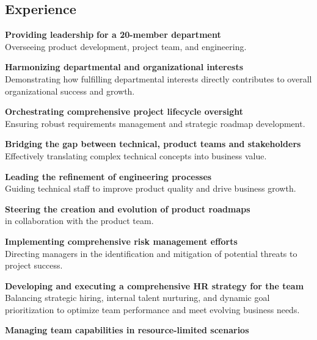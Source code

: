 \documentclass[]{external}
\begin{document}
\begin{paracol}{2}
    \section{Experience}
    \vspace{\topsep}
    \begin{tightemize}
        \item \textbf{Providing leadership} \textbf{for a 20-member department}\\
        Overseeing product development, project team, and engineering.
        \item \textbf{Harmonizing departmental and organizational interests} \\
        Demonstrating how fulfilling departmental interests directly contributes to overall organizational success and growth.
        \item \textbf{Orchestrating comprehensive project lifecycle oversight} \\
        Ensuring robust requirements management and strategic roadmap development.
        \item \textbf{Bridging the gap between technical, product teams and stakeholders} \\ Effectively translating complex technical concepts into business value.
        \item \textbf{Leading the refinement of engineering processes} \\
        Guiding technical staff to improve product quality and drive business growth.
        \item \textbf{Steering the creation and evolution of product roadmaps}  \\ in collaboration with the product team.
        \item \textbf{Implementing comprehensive risk management efforts} \\
        Directing managers in the identification and mitigation of potential threats to project success.
        \item \textbf{Developing and executing a comprehensive HR strategy for the team} \\
        Balancing strategic hiring, internal talent nurturing, and dynamic goal prioritization to optimize team performance and meet evolving business needs.
        \item \textbf{Managing team capabilities in resource-limited scenarios}\\

\end{tightemize}
\end{paracol}
\end{document}
